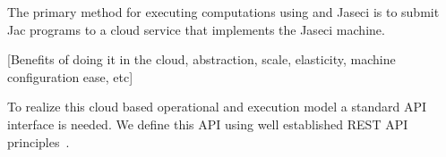 The primary method for executing computations using  and Jaseci is to submit Jac programs to a cloud service that implements the Jaseci machine.

[Benefits of doing it in the cloud, abstraction, scale, elasticity, machine configuration ease, etc]

To realize this cloud based operational and execution model a standard API interface is needed. We define this API using well established REST API principles~\cite{RESTAPIsOReilly,article_key}.

